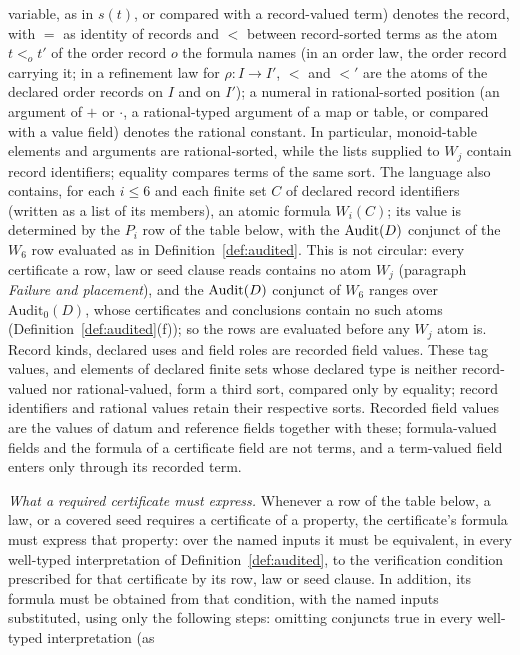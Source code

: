 variable, as in \(s(t)\), or compared with a record-valued term)
denotes the record, with \(=\) as identity of records and \(<\) between record-sorted terms as the atom \(t<_o t'\) of the order
record \(o\) the formula names (in an order law, the order record carrying it; in a refinement law for
\(\rho:I\to I'\), \(<\) and \(<'\) are the atoms of the declared order records on
\(I\) and on \(I'\)); a numeral in rational-sorted position (an argument of
\(+\) or \(\cdot\), a rational-typed argument of a map or table, or compared
with a value field) denotes the rational constant. In particular, monoid-table
elements and arguments are rational-sorted, while the lists supplied to
\(W_j\) contain record identifiers; equality compares terms of the same sort. The language also
contains, for each \(i\le 6\) and each finite set \(C\) of declared record
identifiers (written as a list of its members), an atomic formula \(W_i(C)\); its value is determined by the \(P_i\)
row of the table below, with the \(\operatorname{Audit}\!\left(D\right)\) conjunct of the \(W_6\) row
evaluated as in Definition~\ref{def:audited}. This is not circular: every certificate a row, law or seed clause reads contains no atom \(W_j\) (paragraph \emph{Failure and placement}), and the \(\operatorname{Audit}\!\left(D\right)\) conjunct of \(W_6\) ranges over \(\mathrm{Audit}_0(D)\), whose certificates and conclusions contain no such atoms (Definition~\ref{def:audited}(f)); so the rows are evaluated before any \(W_j\) atom is. Record kinds, declared uses and
field roles are recorded field values. These tag values, and elements of declared finite sets whose declared type is neither record-valued nor rational-valued, form a third sort, compared only by equality; record identifiers and rational values retain their respective sorts. Recorded field values are the values of datum and reference fields together with these; formula-valued fields and the formula of a certificate field are not terms, and a term-valued field enters only through its recorded term.
\par\emph{What a required certificate must express.} Whenever a row of
the table below, a law, or a covered seed requires a certificate of a
property, the certificate's formula must express that property: over the named inputs
it must be equivalent, in every well-typed interpretation of
Definition~\ref{def:audited}, to the verification condition prescribed for
that certificate by its row, law or seed clause. In addition, its formula must be
obtained from that condition, with the named inputs substituted, using only the
following steps: omitting conjuncts true in every well-typed interpretation (as
